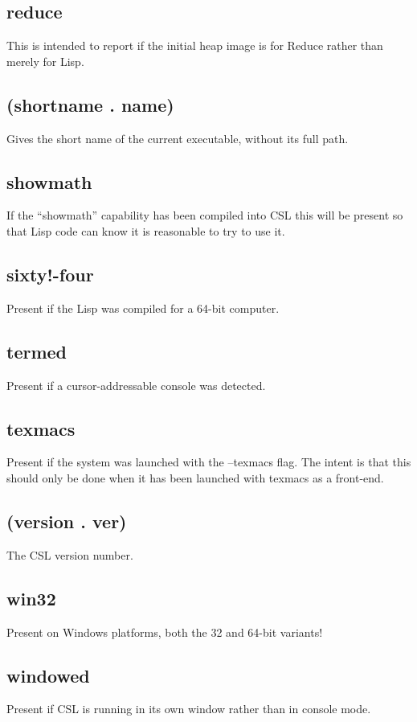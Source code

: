 \documentclass[a4paper,11pt]{article}
\begin{document}
{\subsection{\ttfamily reduce}
   This is intended to report if the initial heap image is for Reduce rather than
   merely for Lisp.

\subsection{\ttfamily (shortname . name)}
   Gives the short name of the current executable, without its full path.

\subsection{\ttfamily showmath}
   If the ``showmath'' capability has been compiled into CSL this will be present
   so that Lisp code can know it is reasonable to try to use it.

\subsection{\ttfamily sixty!-four}
   Present if the Lisp was compiled for a 64-bit computer.

\subsection{\ttfamily termed}
   Present if a cursor-addressable console was detected.

\subsection{\ttfamily texmacs}
   Present if the system was launched with the {\ttfamily --texmacs} flag.
   The intent is that this should only be done when it has been launched with
   texmacs as a front-end.

\subsection{\ttfamily (version . ver)}
   The CSL version number.

\subsection{\ttfamily win32}
   Present on Windows platforms, both the 32 and 64-bit variants!

\subsection{\ttfamily windowed}
   Present if CSL is running in its own window rather than in console mode.

}
\end{document}
